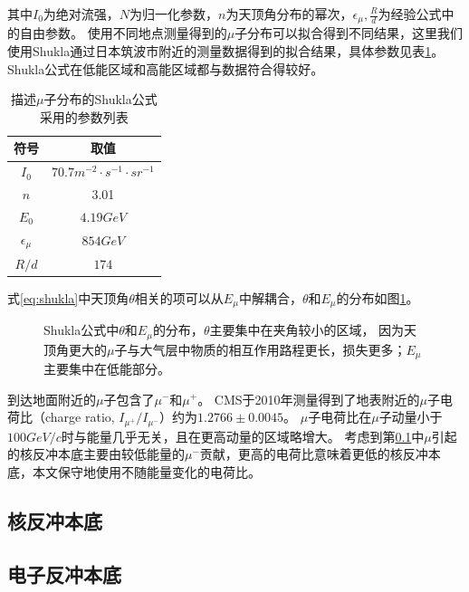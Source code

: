 其中$I_0$为绝对流强，$N$为归一化参数，$n$为天顶角分布的幂次，$\epsilon_\mu,\frac{R}{d}$为经验公式中的自由参数。
使用不同地点测量得到的$\mu$子分布可以拟合得到不同结果，这里我们使用Shukla通过日本筑波市附近的测量数据得到的拟合结果，具体参数见表\ref{tab:shukla}。
Shukla公式在低能区域和高能区域都与数据符合得较好。

\begin{table}
  \centering
  \caption{描述$\mu$子分布的Shukla公式采用的参数列表}
  \begin{tabular}{c|c}
    \toprule
    符号 & 取值 \\
    \midrule
    $I_0$ & $70.7\si{m^{-2}\cdot s^{-1}\cdot sr^{-1}}$ \\
    $n$ & 3.01 \\
    $E_0$ & $4.19\si{GeV}$ \\
    $\epsilon_\mu$ & $854\si{GeV}$ \\
    $R/d$ & $174$ \\
    \bottomrule
  \end{tabular}
  \label{tab:shukla}
\end{table}

式\ref{eq:shukla}中天顶角$\theta$相关的项可以从$E_\mu$中解耦合，$\theta$和$E_\mu$的分布如图\ref{fig:shukla_distribution}。

\begin{figure}
    \centering
    
    \caption{\label{fig:shukla_distribution} Shukla公式中$\theta$和$E_\mu$的分布，$\theta$主要集中在夹角较小的区域，
    因为天顶角更大的$\mu$子与大气层中物质的相互作用路程更长，损失更多；$E_\mu$主要集中在低能部分。}
\end{figure}

到达地面附近的$\mu$子包含了$\mu^-$和$\mu^+$。
CMS于2010年测量得到了地表附近的$\mu$子电荷比（charge ratio, $I_{\mu^+}/I_{\mu^-}$）约为$1.2766\pm0.0045$\cite{the_cms_collaboration_measurement_2010}。
$\mu$子电荷比在$\mu$子动量小于$100\si{GeV/c}$时与能量几乎无关，且在更高动量的区域略增大。
考虑到第\ref{sec:muon_nr}中$\mu$引起的核反冲本底主要由较低能量的$\mu^-$贡献，更高的电荷比意味着更低的核反冲本底，本文保守地使用不随能量变化的电荷比。

\subsection{核反冲本底}
\label{sec:muon_nr}

\subsection{电子反冲本底}

